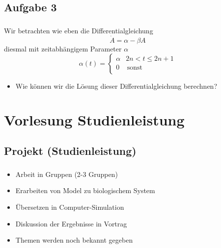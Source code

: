 \subsection{Aufgabe 3}
\label{subsec:exercise-1}
\begin{frame}
    \frametitle{\insertsubsection}
    Wir betrachten wie eben die Differentialgleichung
    \[\dot{A} = \alpha - \beta A\]
    diesmal mit zeitabhängigem Parameter $\alpha$
    \[\alpha(t) = \left\{\begin{array}{ll}
        \alpha & 2n < t \leq 2n+1 \\
        0 & \, \textrm{sonst} \\
        \end{array}\right.\]
    \begin{itemize}[<+->]
        \item Wie können wir die Lösung dieser Differentialgleichung berechnen?
    \end{itemize}
\end{frame}


\section{Vorlesung Studienleistung}
\subsection{Projekt (Studienleistung)}
\label{subsec:project}
\begin{frame}
    \frametitle{\insertsubsection}
    \begin{itemize}[<+->]
        \item Arbeit in Gruppen (2-3 Gruppen)
        \item Erarbeiten von Model zu biologischem System
        \item Übersetzen in Computer-Simulation
        \item Diskussion der Ergebnisse in Vortrag
        \item Themen werden noch bekannt gegeben
    \end{itemize}
\end{frame}

